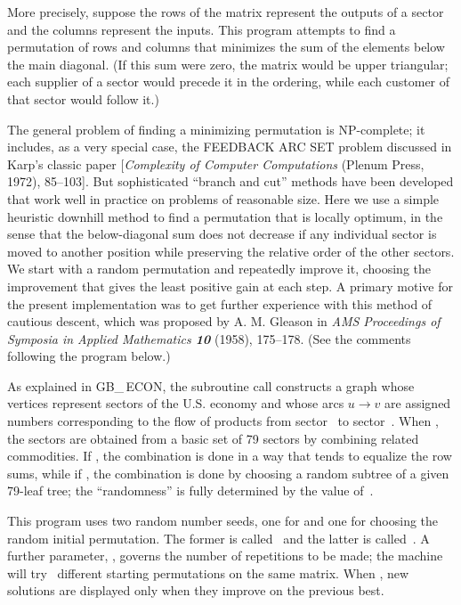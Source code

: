 More precisely, suppose the rows of the matrix represent the outputs
of a sector and the columns represent the inputs. This program attempts
to find a permutation of rows and columns that minimizes the sum of
the elements below the main diagonal. (If this sum were zero, the
matrix would be upper triangular; each supplier of a sector would precede
it in the ordering, while each customer of that sector would follow it.)

The general problem of finding a minimizing permutation is NP-complete;
it includes, as a very special case, the {\sc FEEDBACK ARC SET} problem
discussed in Karp's classic paper [{\sl Complexity of Computer
Computations} (Plenum Press, 1972), 85--103].
But sophisticated ``branch and cut'' methods have been developed that work
well in practice on problems of reasonable size.
Here we use a simple heuristic downhill method
to find a permutation that is locally optimum, in the sense that
the below-diagonal sum does not decrease if any individual
sector is moved to another position while preserving the relative order
of the other sectors. We start with a random permutation and repeatedly
improve it, choosing the improvement that gives the least positive
gain at each step. A primary motive for the present implementation
was to get further experience with this method of cautious descent, which
was proposed by A. M. Gleason in {\sl AMS Proceedings of Symposia in Applied
Mathematics\/ \bf10} (1958), 175--178. (See the comments following
the program below.)

\fi

As explained in {\sc GB\_\,ECON}, the subroutine call 
constructs a graph whose  vertices represent sectors of the
U.S. economy and whose arcs $u\to v$ are assigned numbers corresponding to the
flow of products from sector~ to sector~. When , the
 sectors are obtained from a basic set of 79 sectors by
combining related commodities. If , the combination is done in
a way that tends to equalize the row sums, while if , the
combination
is done by choosing a random subtree of a given 79-leaf tree;
the ``randomness'' is fully determined by the value of~.

This program uses two random number seeds, one for  and one
for choosing the random initial permutation. The former is called~
and the latter is called~. A further parameter, , governs the
number of repetitions to be made; the machine will try ~different
starting permutations
on the same matrix. When , new solutions are displayed only
when
they improve on the previous best.

